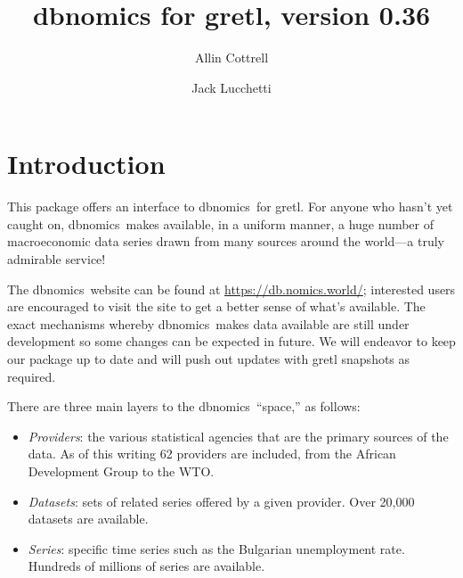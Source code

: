 \documentclass{article}
\begin{document}
\setlength{\parindent}{0pt}
\setlength{\parskip}{1ex}
\setcounter{secnumdepth}{1}


\newenvironment{funcdoc}
{\noindent\hrulefill\\[-10pt]}
{\medskip}

\newcommand{\argname}[1]{\textsl{#1}}
\newcommand{\DB}{\textsf{dbnomics}}
  
\title{dbnomics for gretl, version 0.36}
\author{Allin Cottrell \and Jack Lucchetti}
\maketitle

\section{Introduction}

This package offers an interface to \DB\ for gretl. For
anyone who hasn't yet caught on, \DB\  makes available, in
a uniform manner, a huge number of macroeconomic data series drawn
from many sources around the world---a truly admirable service!

The \DB\ website can be found at \url{https://db.nomics.world/};
interested users are encouraged to visit the site to get a better
sense of what's available. The exact mechanisms whereby \DB\ makes
data available are still under development so some changes can be
expected in future. We will endeavor to keep our package up to date
and will push out updates with gretl snapshots as required.

There are three main layers to the \DB\ ``space,'' as
follows:
\begin{itemize}
\item \textit{Providers}: the various statistical agencies that are
  the primary sources of the data. As of this writing 62 providers
  are included, from the African Development Group to the WTO.
\item \textit{Datasets}: sets of related series offered by a given
  provider. Over 20,000 datasets are available.
\item \textit{Series}: specific time series such as the Bulgarian
  unemployment rate. Hundreds of millions of series are available.
\end{itemize}
\end{document}
